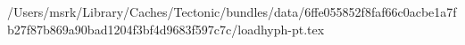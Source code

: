 /Users/msrk/Library/Caches/Tectonic/bundles/data/6ffe055852f8faf66c0acbe1a7fb27f87b869a90bad1204f3bf4d9683f597c7c/loadhyph-pt.tex
